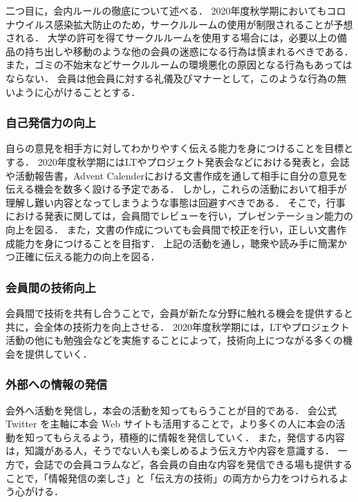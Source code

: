     二つ目に，会内ルールの徹底について述べる．
    2020年度秋学期においてもコロナウイルス感染拡大防止のため，サークルルームの使用が制限されることが予想される．
    大学の許可を得てサークルルームを使用する場合には，必要以上の備品の持ち出しや移動のような他の会員の迷惑になる行為は慎まれるべきである．
    また，ゴミの不始末などサークルルームの環境悪化の原因となる行為もあってはならない．
    会員は他会員に対する礼儀及びマナーとして，このような行為の無いように心がけることとする．

\subsubsection*{自己発信力の向上}
    自らの意見を相手方に対してわかりやすく伝える能力を身につけることを目標とする．
    2020年度秋学期にはLTやプロジェクト発表会などにおける発表と，会誌や活動報告書，Advent Calenderにおける文書作成を通して相手に自分の意見を伝える機会を数多く設ける予定である．
    しかし，これらの活動において相手が理解し難い内容となってしまうような事態は回避すべきである．
    そこで，行事における発表に関しては，会員間でレビューを行い，プレゼンテーション能力の向上を図る．
    また，文書の作成についても会員間で校正を行い，正しい文書作成能力を身につけることを目指す．
    上記の活動を通し，聴衆や読み手に簡潔かつ正確に伝える能力の向上を図る．

\subsubsection*{会員間の技術向上}
    会員間で技術を共有し合うことで，会員が新たな分野に触れる機会を提供すると共に，会全体の技術力を向上させる．
    2020年度秋学期には，LTやプロジェクト活動の他にも勉強会などを実施することによって，技術向上につながる多くの機会を提供していく．

\subsubsection*{外部への情報の発信}
    会外へ活動を発信し，本会の活動を知ってもらうことが目的である．
    会公式 Twitter を主軸に本会 Web サイトも活用することで，より多くの人に本会の活動を知ってもらえるよう，積極的に情報を発信していく．
    また，発信する内容は，知識がある人，そうでない人も楽しめるよう伝え方や内容を意識する．
    一方で，会誌での会員コラムなど，各会員の自由な内容を発信できる場も提供することで，「情報発信の楽しさ」と「伝え方の技術」の両方から力をつけられるよう心がける．
